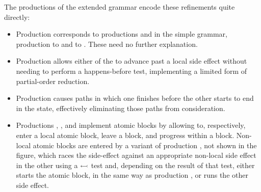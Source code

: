 The productions of the extended grammar encode these refinements quite
directly:
\begin{itemize}
\item Production  corresponds to productions
   and  in the simple grammar,
  production  to  and  to
  .  These need no further explanation.
\item Production  allows either of the {\StateMachines}
  to advance past a local side effect without needing to perform a
  happens-before test, implementing a limited form of partial-order
  reduction.
\item Production  causes paths in which one
  {\StateMachine} finishes before the other starts to end in the
  {\stUnreached} state, effectively eliminating those paths from
  consideration.
\item Productions , , and
   implement atomic blocks by allowing {\StateMachines}
  to, respectively, enter a local atomic block, leave a block, and
  progress within a block.  Non-local atomic blocks are entered by a
  variant of production , not shown in the figure,
  which races the {\stStartAtomic} side-effect against an appropriate
  non-local side effect in the other {\StateMachine} using a
  $\leftarrowtail$ test and, depending on the result of that test,
  either starts the atomic block, in the same way as production
  , or runs the other side effect.
\end{itemize}
